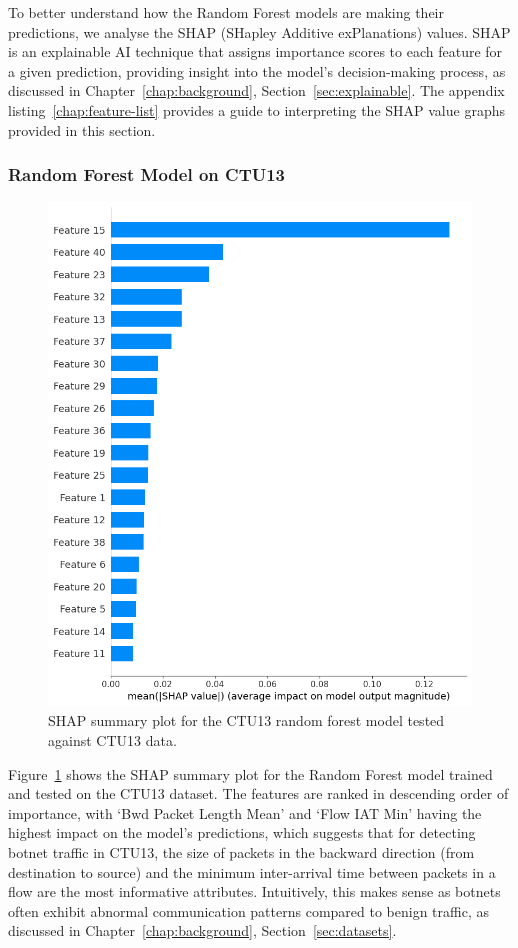 To better understand how the Random Forest models are making their predictions, we analyse the SHAP (SHapley Additive exPlanations) values. SHAP is an explainable AI technique that assigns importance scores to each feature for a given prediction, providing insight into the model's decision-making process, as discussed in Chapter~\ref{chap:background}, Section~\ref{sec:explainable}.
The appendix listing~\ref{chap:feature-list} provides a guide to interpreting the SHAP value graphs provided in this section.

\subsubsection{Random Forest Model on CTU13}\label{subsec:rf-ctu13}

\begin{figure}[H]
\centering
\includegraphics[width=\textwidth]{img/SHAP_RFCTU13_CTU13.png}
\caption{SHAP summary plot for the CTU13 random forest model tested against CTU13 data.}\label{fig:shap_rfc_ctu13_ctu13}
\end{figure}

Figure~\ref{fig:shap_rfc_ctu13_ctu13} shows the SHAP summary plot for the Random Forest model trained and tested on the CTU13 dataset. The features are ranked in descending order of importance, with `Bwd Packet Length Mean' and `Flow IAT Min' having the highest impact on the model's predictions, which suggests that for detecting botnet traffic in CTU13, the size of packets in the backward direction (from destination to source) and the minimum inter-arrival time between packets in a flow are the most informative attributes. Intuitively, this makes sense as botnets often exhibit abnormal communication patterns compared to benign traffic, as discussed in Chapter~\ref{chap:background}, Section~\ref{sec:datasets}.

